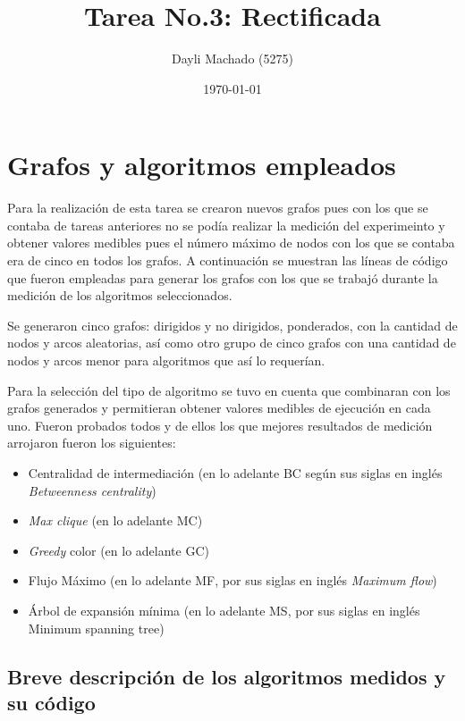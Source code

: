 \documentclass{article}
\title{Tarea No.3: Rectificada}
\author{Dayli Machado (5275)}
\date{\today}
\begin{document}
\maketitle



\section{Grafos y algoritmos empleados}

Para la realización de esta tarea se crearon nuevos grafos pues con los que se contaba de tareas anteriores no se podía realizar la medición del experimeinto y obtener valores medibles pues el número máximo de nodos con los que se contaba era de cinco en todos los grafos.
A continuación se muestran las líneas de código que fueron empleadas para generar los grafos con los que se trabajó durante la medición de los algoritmos seleccionados.



Se generaron cinco grafos: dirigidos y no dirigidos, ponderados, con la cantidad de nodos y arcos aleatorias, así como otro grupo de cinco grafos con una cantidad de nodos y arcos menor para algoritmos que así lo requerían.

Para la selección del tipo de algoritmo se tuvo en cuenta que combinaran con los grafos generados y permitieran obtener valores medibles de ejecución en cada uno. Fueron probados todos y de ellos los que mejores resultados de medición arrojaron fueron los siguientes:

\begin{itemize}
\item Centralidad de intermediación (en lo adelante BC según sus siglas en inglés \textit{Betweenness centrality})
\item \textit{Max clique }(en lo adelante MC)
\item \textit{Greedy} color (en lo adelante GC)
\item Flujo Máximo (en lo adelante MF, por sus siglas en inglés \textit{Maximum flow})
\item Árbol de expansión mínima (en lo adelante MS, por sus siglas en inglés Minimum spanning tree)
\end{itemize}

\subsection{Breve descripción de los algoritmos medidos y su código} 
\end{document}
